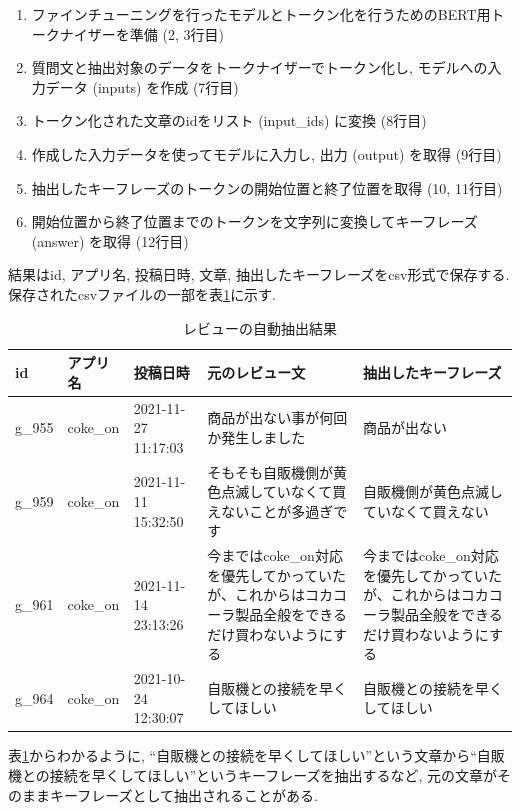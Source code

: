 \begin{enumerate}
  \item ファインチューニングを行ったモデルとトークン化を行うためのBERT用トークナイザーを準備 (2, 3行目)
  \item 質問文と抽出対象のデータをトークナイザーでトークン化し, モデルへの入力データ (inputs) を作成 (7行目)
  \item トークン化された文章のidをリスト (input\_ids) に変換 (8行目)
  \item 作成した入力データを使ってモデルに入力し, 出力 (output) を取得 (9行目)
  \item 抽出したキーフレーズのトークンの開始位置と終了位置を取得 (10, 11行目)
  \item 開始位置から終了位置までのトークンを文字列に変換してキーフレーズ (answer) を取得 (12行目)
\end{enumerate}
結果はid, アプリ名, 投稿日時, 文章, 抽出したキーフレーズをcsv形式で保存する. 保存されたcsvファイルの一部を表\ref{tb:googleqa}に示す. 

\begin{table}[H]
  \caption{レビューの自動抽出結果}
  \label{tb:googleqa}
  \small
  \begin{center}
  \begin{tabularx}{\linewidth}{l|l|X|X|X}
    \hline
    id&アプリ名&投稿日時&元のレビュー文&抽出したキーフレーズ\\\hline\hline
    g\_955&coke\_on&2021-11-27 11:17:03&商品が出ない事が何回か発生しました&商品が出ない\\\hline
    g\_959&coke\_on&2021-11-11 15:32:50&そもそも自販機側が黄色点滅していなくて買えないことが多過ぎです&自販機側が黄色点滅していなくて買えない\\\hline
    g\_961&coke\_on&2021-11-14 23:13:26&今まではcoke\_on対応を優先してかっていたが、これからはコカコーラ製品全般をできるだけ買わないようにする&今まではcoke\_on対応を優先してかっていたが、これからはコカコーラ製品全般をできるだけ買わないようにする\\\hline
    g\_964&coke\_on&2021-10-24 12:30:07&自販機との接続を早くしてほしい&自販機との接続を早くしてほしい\\\hline
  \end{tabularx}\end{center}
\end{table}

表\ref{tb:googleqa}からわかるように, ``自販機との接続を早くしてほしい''という文章から``自販機との接続を早くしてほしい''というキーフレーズを抽出するなど, 元の文章がそのままキーフレーズとして抽出されることがある. 

